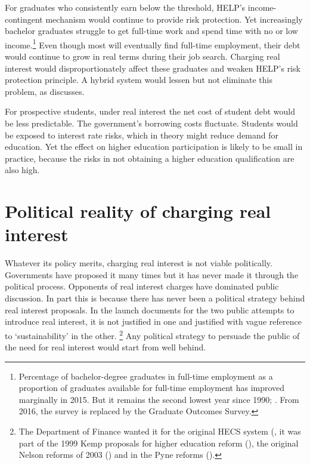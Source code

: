 \documentclass[embargoed]{grattan}
\begin{document}
For graduates who consistently earn below the threshold, \gls{HELP}'s income-contingent mechanism would continue to provide risk protection.
Yet increasingly bachelor graduates struggle to get full-time work and spend time with no or low income.\footnote{Percentage of bachelor-degree graduates in full-time employment as a proportion of graduates available for full-time employment has improved marginally in 2015.
But it remains the second lowest year since 1990; \textcite{GCAvariousyearsGradStatsemploymentsalary}.
From 2016, the survey is replaced by the Graduate Outcomes Survey.} Even though most will eventually find full-time employment, their debt would continue to grow in real terms during their job search.
Charging real interest would disproportionately affect these graduates and weaken \gls{HELP}'s risk protection principle.
A hybrid system would lessen but not eliminate this problem, as  discusses.

For prospective students, under real interest the net cost of student debt would be less predictable.
The government's borrowing costs fluctuate.
Students would be exposed to interest rate risks, which in theory might reduce demand for education.
Yet the effect on higher education participation is likely to be small in practice, because the risks in not obtaining a higher education qualification are also high.

\section{Political reality of charging real interest}\label{political-reality-of-charging-real-interest}

Whatever its policy merits, charging real interest is not viable politically.
Governments have proposed it many times but it has never made it through the political process.
Opponents of real interest charges have dominated public discussion.
In part this is because there has never been a political strategy behind real interest proposals.
In the launch documents for the two public attempts to introduce real interest, it is not justified in one and justified with vague reference to `sustainability' in the other.%
\footnote{The Department of Finance wanted it for the original \gls{HECS} system (\textcite{Archives19882015Cabinetsubmission5922}, it was part of the 1999 Kemp proposals for higher education reform (\textcite{Kemp2001Appendix4Leaked}), the original Nelson reforms of 2003 (\textcite{Nelson2003OuruniversitiesBacking}) and in the Pyne reforms (\textcite{Education2014Portfoliobudgetstatements}).} 
Any political strategy to persuade the public of the need for real interest would start from well behind.
\end{document}

